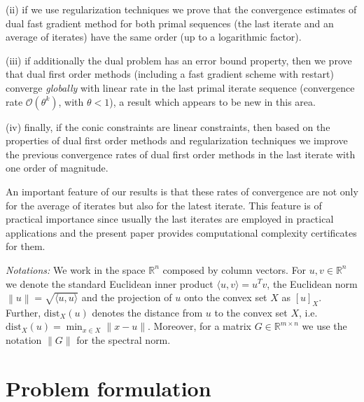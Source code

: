 \documentclass{gOMS2e}
\theoremstyle{plain}
\theoremstyle{definition}
\theoremstyle{remark}
\begin{document}
\noindent (ii)  if we use regularization techniques we prove that
the convergence estimates  of  dual fast gradient method for both
primal sequences (the last iterate  and an average of iterates) have
the same order (up to a logarithmic factor).

\noindent (iii) if additionally the dual problem has an error bound
property,  then we prove that dual first order methods (including a
 fast gradient scheme with restart) converge \textit{globally} with linear rate
in the last primal iterate sequence (convergence rate
$\mathcal{O}(\theta^k)$, with $\theta<1$), a result which appears to
be new in this area.

\noindent (iv) finally, if the conic constraints are linear
constraints, then based on the properties of dual first order
methods and regularization techniques we  improve the previous
convergence rates of dual first order methods in the last iterate
with one order of magnitude.

\noindent An important feature of our results is that these rates of
convergence are  not only for the average of iterates but also  for
the latest iterate. This feature is of practical importance since
usually the  last iterates are employed in practical applications
and the present paper provides computational complexity certificates
for them.

\vspace{0.1cm}

\noindent \textit{Notations:} We work in the space ${\mathbb{R}}^n$
composed by column vectors. For $u,v \in {\mathbb{R}}^n$ we denote the
standard Euclidean  inner product $\langle u,v \rangle = u^T v$, the
Euclidean norm $\left \| u \right \|=\sqrt{\langle u,u \rangle}$ and
the projection of $u$ onto the convex set $X$ as $\left[u
\right]_X$. Further, $\text{dist}_X(u)$ denotes the distance from
$u$ to the convex set $X$, i.e. $\text{dist}_X(u) =\min_{x \in X}
\|x-u\|$. Moreover, for a matrix $G \in {\mathbb{R}}^{m \times n}$ we use
the notation $\|G\|$ for the spectral norm.

\section{Problem formulation}
\label{sec_formulation}
\end{document}
